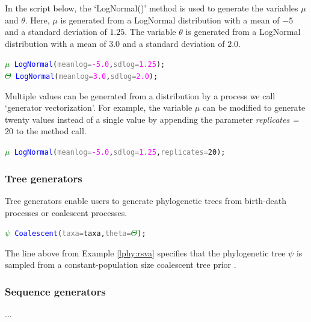 \documentclass[10pt,letterpaper,table]{article}
\begin{document}
In the script below, the `LogNormal()' method is used to generate the variables $\mu$ and $\theta$. 
Here, $\mu$ is generated from a LogNormal distribution with a mean of $-5$ and a standard deviation of $1.25$. 
The variable $\theta$ is generated from a LogNormal distribution with a mean of $3.0$ and a standard deviation of $2.0$.  

{\singlespacing
\begin{alltt}
  \textcolor{green}{\(\mu\)} ~ \textcolor{blue}{LogNormal}(\textcolor{gray}{meanlog=}\textcolor{magenta}{-5.0}, \textcolor{gray}{sdlog=}\textcolor{magenta}{1.25});
  \textcolor{green}{\(\Theta\)} ~ \textcolor{blue}{LogNormal}(\textcolor{gray}{meanlog=}\textcolor{magenta}{3.0}, \textcolor{gray}{sdlog=}\textcolor{magenta}{2.0});
\end{alltt}
}

Multiple values can be generated from a distribution by a process we call `generator vectorization'. 
For example, the variable $\mu$ can be modified to generate twenty values instead of a single value by appending the parameter \textit{replicates = $20$} to the method call. 

{\singlespacing
\begin{alltt}
  \textcolor{green}{\(\mu\)} ~ \textcolor{blue}{LogNormal}(\textcolor{gray}{meanlog=}\textcolor{magenta}{-5.0}, \textcolor{gray}{sdlog=}\textcolor{magenta}{1.25}, \textcolor{gray}{replicates=}20);
\end{alltt}
}

\subsubsection*{Tree generators}
Tree generators enable users to generate phylogenetic trees from birth-death processes or coalescent processes. 
{\small
  \begin{alltt}
    \textcolor{green}{\(\psi\)} ~ \textcolor{blue}{Coalescent}(\textcolor{gray}{taxa=}taxa, \textcolor{gray}{theta=}\textcolor{green}{\(\Theta\)});
  \end{alltt}
}
The line above from Example \ref{lphy:rsva} specifies that the
phylogenetic tree \texttt{$\psi$} is sampled from a
constant-population size coalescent tree prior \cite{kingman82}.
\newline

\subsubsection*{Sequence generators}
...
\end{document}
